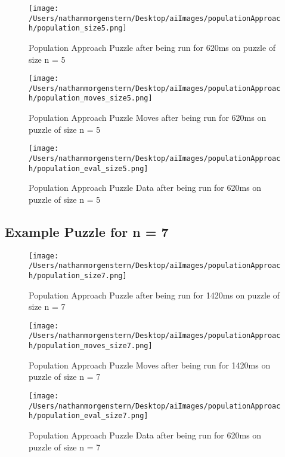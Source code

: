 \documentclass{report}
\begin{document}
	\begin{figure}[H]
	\centering
	\texttt{[image: /Users/nathanmorgenstern/Desktop/aiImages/populationApproach/population\_size5.png]}
	\caption{Population Approach Puzzle after being run for 620ms on puzzle of size n = 5}
	\label{fig: Population Approach Puzzle after being run for 620ms on puzzle of size n = 5}
	\end{figure}
	
	\begin{figure}[H]
	\centering
	\texttt{[image: /Users/nathanmorgenstern/Desktop/aiImages/populationApproach/population\_moves\_size5.png]}
	\caption{Population Approach Puzzle Moves after being run for 620ms on puzzle of size n = 5}
	\label{fig: Population Approach Puzzle Moves after being run for 620ms on puzzle of size n = 5}
	\end{figure}
	
	\begin{figure}[H]
	\centering
	\texttt{[image: /Users/nathanmorgenstern/Desktop/aiImages/populationApproach/population\_eval\_size5.png]}
	\caption{Population Approach Puzzle Data after being run for 620ms on puzzle of size n = 5}
	\label{fig: Population Approach Puzzle Data after being run for 620ms on puzzle of size n = 5}
	\end{figure}

\subsection{Example Puzzle for n = 7}

	\begin{figure}[H]
	\centering
	\texttt{[image: /Users/nathanmorgenstern/Desktop/aiImages/populationApproach/population\_size7.png]}
	\caption{Population Approach Puzzle after being run for 1420ms on puzzle of size n = 7}
	\label{fig: Population Approach Puzzle after being run for 1420ms on puzzle of size n = 7}
	\end{figure}
	
	\begin{figure}[H]
	\centering
	\texttt{[image: /Users/nathanmorgenstern/Desktop/aiImages/populationApproach/population\_moves\_size7.png]}
	\caption{Population Approach Puzzle Moves after being run for 1420ms on puzzle of size n = 7}
	\label{fig: Population Approach Puzzle Moves after being run for 1420ms on puzzle of size n = 7}
	\end{figure}
	
	\begin{figure}[H]
	\centering
	\texttt{[image: /Users/nathanmorgenstern/Desktop/aiImages/populationApproach/population\_eval\_size7.png]}
	\caption{Population Approach Puzzle Data after being run for 620ms on puzzle of size n = 7}
	\label{fig: Population Approach Puzzle Data after being run for 620ms on puzzle of size n = 7}
	\end{figure}
\end{document}
